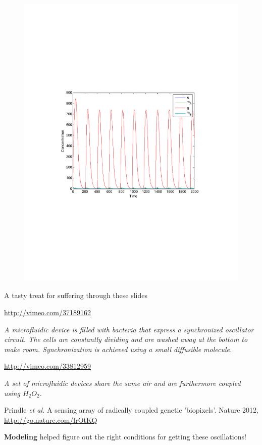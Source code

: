 \documentclass[handout]{beamer} %
\begin{document}
\begin{frame}
\pause
\begin{figure}[htp]
    \includegraphics[scale=0.60, clip=true, trim=3.5cm 8cm 3.5cm 8cm]{sys3.pdf}
\end{figure}

\end{frame}

\begin{frame}{A tasty treat for suffering through these slides}

\href{http://vimeo.com/37189162}{http://vimeo.com/37189162}

\emph{A microfluidic device is filled with bacteria that express a synchronized oscillator circuit. The cells are constantly dividing and are washed away at the bottom to make room. Synchronization is achieved using a small diffusible molecule.}

\vspace{3 mm}

\href{http://vimeo.com/33812959}{http://vimeo.com/33812959}

\emph{A set of microfluidic devices share the same air and are furthermore coupled using $H_2O_2$.}

Prindle \emph{et al.} A sensing array of radically coupled genetic 'biopixels'. Nature 2012, \href{http://go.nature.com/lrOtKQ}{http://go.nature.com/lrOtKQ}


\vspace{3 mm} \pause

\textbf{Modeling} helped figure out the right conditions for getting these oscillations!

\end{frame}
\end{document}
